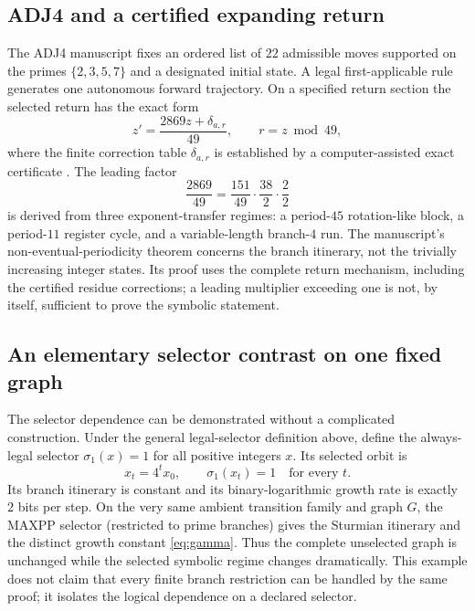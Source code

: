 \documentclass[11pt,a4paper]{article}
\theoremstyle{definition}\newtheorem{definition}[theorem]{Definition}
\begin{document}
\subsection{ADJ4 and a certified expanding return}
The ADJ4 manuscript fixes an ordered list of $22$ admissible moves supported on the primes $\{2,3,5,7\}$ and a designated initial state. A legal first-applicable rule generates one autonomous forward trajectory. On a specified return section the selected return has the exact form
\begin{equation}\label{eq:adj}
z' =\frac{2869z+\delta_{a,r}}{49},\qquad r=z\bmod49,
\end{equation}
where the finite correction table $\delta_{a,r}$ is established by a computer-assisted exact certificate \cite{adj}. The leading factor
\begin{equation}\label{eq:adjfactor}
\boxed{\frac{2869}{49}=\frac{151}{49}\cdot\frac{38}{2}\cdot\frac{2}{2}}
\end{equation}
is derived from three exponent-transfer regimes: a period-$45$ rotation-like block, a period-$11$ register cycle, and a variable-length branch-$4$ run. The manuscript's non-eventual-periodicity theorem concerns the branch itinerary, not the trivially increasing integer states. Its proof uses the complete return mechanism, including the certified residue corrections; a leading multiplier exceeding one is not, by itself, sufficient to prove the symbolic statement.

\subsection{An elementary selector contrast on one fixed graph}\label{sec:selection}
The selector dependence can be demonstrated without a complicated construction. Under the general legal-selector definition above, define the always-legal selector $\sigma_1(x)=1$ for all positive integers $x$. Its selected orbit is
\begin{equation}\label{eq:trivialselector}
x_t=4^t x_0,\qquad \sigma_1(x_t)=1\quad\text{for every }t.
\end{equation}
Its branch itinerary is constant and its binary-logarithmic growth rate is exactly $2$ bits per step. On the very same ambient transition family and graph $G$, the MAXPP selector (restricted to prime branches) gives the Sturmian itinerary and the distinct growth constant \eqref{eq:gamma}. Thus the complete unselected graph is unchanged while the selected symbolic regime changes dramatically. This example does not claim that every finite branch restriction can be handled by the same proof; it isolates the logical dependence on a declared selector.
\end{document}
